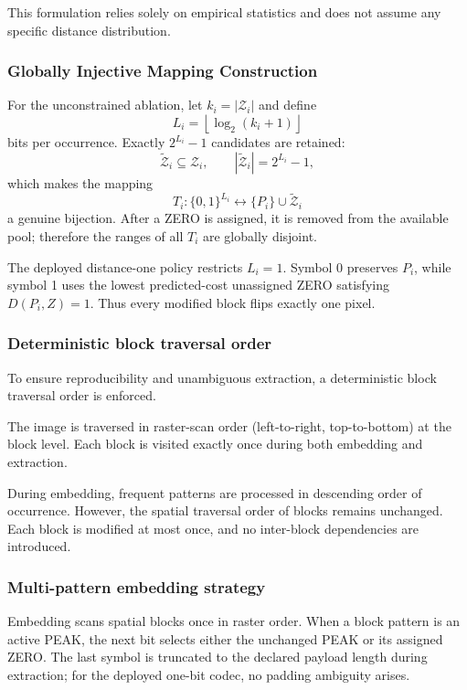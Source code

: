 \documentclass[a4paper,fleqn]{cas-dc}
\begin{document}
This formulation relies solely on empirical statistics and does not assume any specific distance distribution.

\subsubsection{Globally Injective Mapping Construction}

For the unconstrained ablation, let $k_i=|\mathcal{Z}_i|$ and define
\[
L_i = \left\lfloor \log_2 (k_i + 1) \right\rfloor
\]
bits per occurrence. Exactly $2^{L_i}-1$ candidates are retained:
\[
\widetilde{\mathcal Z}_i\subseteq\mathcal Z_i,\qquad
|\widetilde{\mathcal Z}_i|=2^{L_i}-1,
\]
which makes the mapping
\[
T_i:\{0,1\}^{L_i}\longleftrightarrow
\{P_i\}\cup\widetilde{\mathcal Z}_i
\]
a genuine bijection. After a ZERO is assigned, it is removed from the
available pool; therefore the ranges of all $T_i$ are globally disjoint.

The deployed distance-one policy restricts $L_i=1$. Symbol 0 preserves
$P_i$, while symbol 1 uses the lowest predicted-cost unassigned ZERO satisfying
$D(P_i,Z)=1$. Thus every modified block flips exactly one pixel.

\subsubsection*{Deterministic block traversal order}
\label{subsec:order}

To ensure reproducibility and unambiguous extraction, a deterministic block traversal order is enforced.

The image is traversed in raster-scan order (left-to-right, top-to-bottom) at the block level.
Each block is visited exactly once during both embedding and extraction.

During embedding, frequent patterns are processed in descending order of occurrence.
However, the spatial traversal order of blocks remains unchanged.
Each block is modified at most once, and no inter-block dependencies are introduced.

\subsubsection*{Multi-pattern embedding strategy}
\label{subsec:multi_pattern}

Embedding scans spatial blocks once in raster order. When a block pattern is
an active PEAK, the next bit selects either the unchanged PEAK or its assigned
ZERO. The last symbol is truncated to the declared payload length during
extraction; for the deployed one-bit codec, no padding ambiguity arises.
\end{document}
